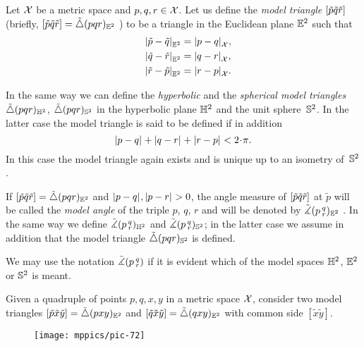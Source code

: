 Let $\mathcal{X}$ be a metric space and 
$p,q,r\in \mathcal{X}$. 
Let us define the \emph{model triangle} $[\tilde p\tilde q\tilde r]$ 
(briefly, 
$[\tilde p\tilde q\tilde r]=\tilde\triangle(p q r)_{\mathbb{E}^2}$%
) to be a triangle in the Euclidean plane $\mathbb{E}^2$ such that
\begin{align*}\dist{\tilde p}{\tilde q}{\EE^2}&=\dist{p}{q}{\spc{X}},
\\
\quad\dist{\tilde q}{\tilde r}{\EE^2}&=\dist{q}{r}{\spc{X}},
\\
\quad\dist{\tilde r}{\tilde p}{\EE^2}&=\dist{r}{p}{\spc{X}}.
\end{align*}

In the same way we can define the \emph{hyperbolic} and the \emph{spherical model triangles} $\tilde\triangle(p q r)_{\mathbb{H}^2}$, $\tilde\triangle(p q r)_{\mathbb{S}^2}$
in the hyperbolic plane $\mathbb{H}^2$ and the unit sphere~$\mathbb{S}^2$.
In the latter case the model triangle is said to be defined if in addition
\[\dist{p}{q}{}+\dist{q}{r}{}+\dist{r}{p}{}< 2\cdot\pi.\]
In this case the model triangle again exists and is unique up to an isometry of~$\mathbb{S}^2$.

If 
$[\tilde p\tilde q\tilde r]=\tilde\triangle(p q r)_{\mathbb{E}^2}$ 
and $\dist{p}{q}{},\dist{p}{r}{}>0$, 
the angle measure of 
$[\tilde p\tilde q\tilde r]$ at $\tilde p$ 
will be called the \emph{model angle} of the triple $p$, $q$, $r$ and will be denoted by
$\tilde\measuredangle(p\,{}^{q}_{r})_{\mathbb{E}^2}$%
\index{$\tangle$!$\angk{{*}}{{*}}{{*}}$}.
In the same way we define $\tilde\measuredangle(p\,{}^{q}_{r})_{\mathbb{H}^2}$ and $\tilde\measuredangle(p\,{}^{q}_{r})_{\mathbb{S}^2}$;
in the latter case  we assume in addition that the model triangle $\tilde\triangle(p q r)_{\mathbb{S}^2}$ is defined.

We may use the notation $\tilde\measuredangle(p\,{}^{q}_{r})$ if it is evident which of the model spaces $\mathbb{H}^2$, $\mathbb{E}^2$ or $\mathbb{S}^2$ is meant.

Given a quadruple of points $p,q,x,y$ in a metric space $\mathcal{X}$,
consider two model triangles 
$[\tilde p\tilde x\tilde y]=\tilde\triangle{}(pxy)_{\mathbb{E}^2}$ 
and 
$\trig{\tilde q}{\tilde x}{\tilde y}\z=\modtrig{}(qxy)_{\EE^2}$ with common side $[\tilde x\tilde y]$.

\begin{wrapfigure}{r}{33mm}
\vskip-4mm
\centering
\texttt{[image: mppics/pic-72]}
\end{wrapfigure}


